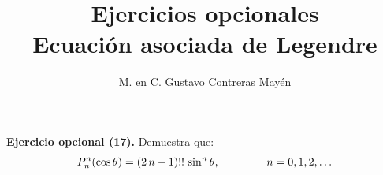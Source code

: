 
\title{Ejercicios opcionales \\[0.3em]  \large{Ecuación asociada de Legendre} \vspace{-3ex}}
\author{M. en C. Gustavo Contreras Mayén}
\date{ }


\vspace{-4cm}
\maketitle
\fontsize{14}{14}\selectfont


\noindent
\textbf{Ejercicio opcional (17).} Demuestra que:
\begin{align*}
P_{n}^{n} (\cos \theta) = (2 \, n - 1)!! \, \sin^{n} \theta, \hspace{1.5cm} n = 0, 1, 2, \ldots
\end{align*}


